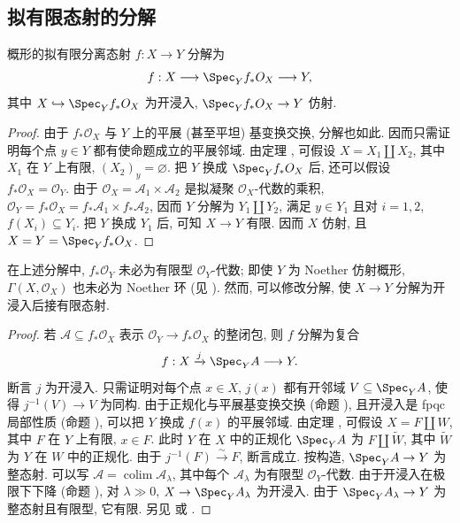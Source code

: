 \subsection{拟有限态射的分解}\label{src:A.7.2-subsection}
\begin{proposition}\label{src:A.7.2}
概形的拟有限分离态射 $f:X\to Y$ 分解为
\[
f:X\longrightarrow\Spec_Y f_*\mathcal O_X\longrightarrow Y,
\]
其中 $X\hookrightarrow\Spec_Y f_*\mathcal O_X$ 为开浸入, $\Spec_Y f_*\mathcal O_X\to Y$ 仿射.
\end{proposition}
\begin{proof}
由于 $f_*\mathcal O_X$ 与 $Y$ 上的平展 (甚至平坦) 基变换交换, 分解也如此. 因而只需证明每个点 $y\in Y$ 都有使命题成立的平展邻域. 由定理 , 可假设 $X=X_1\coprod X_2$, 其中 $X_1$ 在 $Y$ 上有限, $(X_2)_y=\varnothing$. 把 $Y$ 换成 $\Spec_Y f_*\mathcal O_X$ 后, 还可以假设 $f_*\mathcal O_X=\mathcal O_Y$. 由于 $\mathcal O_X=\mathcal A_1\times\mathcal A_2$ 是拟凝聚 $\mathcal O_X$-代数的乘积, $\mathcal O_Y=f_*\mathcal O_X=f_*\mathcal A_1\times f_*\mathcal A_2$, 因而 $Y$ 分解为 $Y_1\coprod Y_2$, 满足 $y\in Y_1$ 且对 $i=1,2$, $f(X_i)\subseteq Y_i$. 把 $Y$ 换成 $Y_1$ 后, 可知 $X\to Y$ 有限. 因而 $X$ 仿射, 且 $X=Y=\Spec_Y f_*\mathcal O_X$.
\end{proof}
在上述分解中, $f_*\mathcal O_Y$ 未必为有限型 $\mathcal O_Y$-代数; 即使 $Y$ 为 Noether 仿射概形, $\Gamma(X,\mathcal O_X)$ 也未必为 Noether 环 (见 \cite[例 $7.2.15$]{Ols16}). 然而, 可以修改分解, 使 $X\to Y$ 分解为开浸入后接有限态射.
\begin{theorem}\label{src:A.7.3}
\end{theorem}
\begin{proof}
若 $\mathcal A\subseteq f_*\mathcal O_X$ 表示 $\mathcal O_Y\to f_*\mathcal O_X$ 的整闭包, 则 $f$ 分解为复合
\[
f:X\xrightarrow{j}\Spec_Y\mathcal A\longrightarrow Y.
\]
断言 $j$ 为开浸入. 只需证明对每个点 $x\in X$, $j(x)$ 都有开邻域 $V\subseteq\Spec_Y\mathcal A$, 使得 $j^{-1}(V)\to V$ 为同构. 由于正规化与平展基变换交换 (命题 ), 且开浸入是 fpqc 局部性质 (命题 ), 可以把 $Y$ 换成 $f(x)$ 的平展邻域. 由定理 , 可假设 $X=F\coprod W$, 其中 $F$ 在 $Y$ 上有限, $x\in F$. 此时 $Y$ 在 $X$ 中的正规化 $\Spec_Y\mathcal A$ 为 $F\coprod\widetilde W$, 其中 $\widetilde W$ 为 $Y$ 在 $W$ 中的正规化. 由于 $j^{-1}(F)\xrightarrow{\sim}F$, 断言成立. 按构造, $\Spec_Y\mathcal A\to Y$ 为整态射. 可以写 $\mathcal A=\operatorname{colim}\mathcal A_\lambda$, 其中每个 $\mathcal A_\lambda$ 为有限型 $\mathcal O_Y$-代数. 由于开浸入在极限下下降 (命题 ), 对 $\lambda\gg0$, $X\to\Spec_Y\mathcal A_\lambda$ 为开浸入. 由于 $\Spec_Y\mathcal A_\lambda\to Y$ 为整态射且有限型, 它有限. 另见 \cite[IV.$8.12.6$]{EGA} 或 \cite[Tag 05K0]{SP}.
\end{proof}
